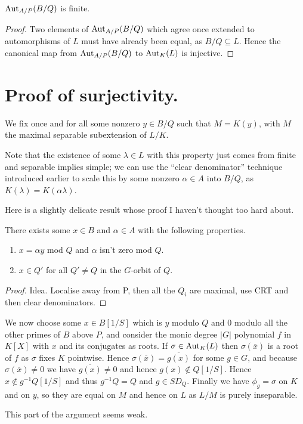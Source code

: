 \begin{corollary} $\operatorname{Aut}_{A/P}(B/Q)$ is finite.
\end{corollary}
\begin{proof}
  Two elements of $\operatorname{Aut}_{A/P}(B/Q)$ which agree once extended to automorphisms of $L$
  must have already been equal, as $B/Q\subseteq L$. Hence the canonical map
  from $\operatorname{Aut}_{A/P}(B/Q)$ to $\operatorname{Aut}_K(L)$ is injective.
\end{proof}

\section{Proof of surjectivity.}

\begin{definition} We fix once and for all some nonzero $y\in B/Q$ such that $M=K(y)$,
  with $M$ the maximal separable subextension of $L/K$.
\end{definition}

Note that the existence of some $\lambda\in L$ with this property just comes from finite
and separable implies simple; we can use the ``clear denominator'' technique introduced
earlier to scale this by some nonzero $\alpha\in A$ into $B/Q$, as
$K(\lambda)=K(\alpha\lambda)$.

Here is a slightly delicate result whose proof I haven't thought too hard about.
\begin{theorem} There exists some $x\in B$ and $\alpha\in A$ with the following
  properties.
  \begin{enumerate}
  \item $x=\alpha y$ mod $Q$ and $\alpha$ isn't zero mod $Q$.
  \item $x\in Q'$ for all $Q'\not=Q$ in the $G$-orbit of $Q$.
  \end{enumerate}
\end{theorem}
\begin{proof}
  Idea. Localise away from P, then all the $Q_i$ are maximal, use CRT and then clear denominators.
\end{proof}

We now choose some $x\in B[1/S]$ which is $y$ modulo $Q$ and $0$ modulo all the other
primes of $B$ above $P$, and consider the monic degree $|G|$ polynomial $f$ in $K[X]$
with $x$ and its conjugates as roots. If $\sigma\in\operatorname{Aut}_K(L)$ then $\sigma(\overline{x})$
is a root of $f$ as $\sigma$ fixes $K$ pointwise. Hence $\sigma(\overline{x})=\overline{g(x)}$
for some $g\in G$, and because $\sigma(\overline{x})\not=0$ we have $\overline{g(x)}\not=0$
and hence $g(x)\notin Q[1/S]$. Hence $x\notin g^{-1} Q[1/S]$ and thus $g^{-1}Q=Q$ and $g\in SD_Q$.
Finally we have $\phi_g=\sigma$ on $K$ and on $y$, so they are equal on $M$ and hence on $L$ as
$L/M$ is purely inseparable.

This part of the argument seems weak.
